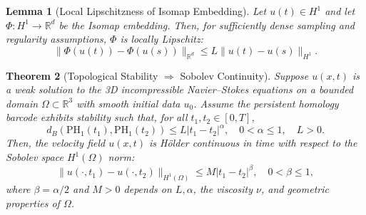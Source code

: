\documentclass[11pt]{article}
\newtheorem{theorem}{Theorem}[section]
\newtheorem{lemma}[theorem]{Lemma}
\theoremstyle{definition}
\begin{document}
\begin{lemma}[Local Lipschitzness of Isomap Embedding]
Let $u(t) \in H^1$ and let $\Phi: H^1 \to \mathbb{R}^d$ be the Isomap embedding. Then, for sufficiently dense sampling and regularity assumptions, $\Phi$ is locally Lipschitz:
\[
\|\Phi(u(t)) - \Phi(u(s))\|_{\mathbb{R}^d} \leq L \|u(t) - u(s)\|_{H^1}.
\]
\end{lemma}

\begin{theorem}[Topological Stability $\Rightarrow$ Sobolev Continuity]
\label{thm:topological_sobolev_continuity}
Suppose $u(x,t)$ is a weak solution to the 3D incompressible Navier--Stokes equations on a bounded domain $\Omega \subset \mathbb{R}^3$ with smooth initial data $u_0$. Assume the persistent homology barcode exhibits stability such that, for all $t_1,t_2\in[0,T]$,
\[
d_B(\mathrm{PH}_1(t_1), \mathrm{PH}_1(t_2)) \leq L|t_1-t_2|^{\alpha}, \quad 0 < \alpha \leq 1, \quad L > 0.
\]
Then, the velocity field $u(x,t)$ is Hölder continuous in time with respect to the Sobolev space $H^1(\Omega)$ norm:
\[
\|u(\cdot,t_1)-u(\cdot,t_2)\|_{H^1(\Omega)} \leq M|t_1-t_2|^{\beta}, \quad 0<\beta\leq 1,
\]
where $\beta = \alpha/2$ and $M > 0$ depends on $L, \alpha$, the viscosity $\nu$, and geometric properties of $\Omega$.
\end{theorem}
\end{document}
